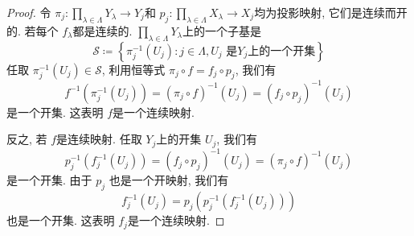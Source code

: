 \documentclass[../main.tex]{subfiles}
\begin{document}
\begin{proof}
    令 \(   \pi_{j}:\prod _{ \lambda \in  \Lambda }Y_{ \lambda }\to Y_{j}  \)和 \(  p_{j}:\prod _{ \lambda \in  \Lambda }X_{ \lambda }\to X_{j}  \)均为投影映射, 它们是连续而开的.  
    若每个 \(  f_{ \lambda }  \)都是连续的. 
    \(  \prod _{ \lambda \in  \Lambda }Y_{ \lambda }  \)上的一个子基是 \[
    \mathcal{S}\coloneqq \left\{  \pi_{j}^{-1} \left( U_{j} \right): j \in  \Lambda , U_{j}\text{ 是} Y_{j}\text{上的一个开集} \right\}
    \] 任取 \(   \pi_{j}^{-1} \left( U_{j} \right)\in \mathcal{S}   \), 利用恒等式 \(   \pi_{j}\circ f = f_{j}\circ p_{j}  \),  我们有 \[
    f^{-1} \left(  \pi_{j}^{-1} \left( U_{j} \right)  \right)= \left(  \pi_{j}\circ f \right)^{-1} \left( U_{j} \right)= \left( f_{j}\circ  p_{j} \right) ^{-1} \left( U_{j} \right) 
    \] 是一个开集. 这表明 \(  f  \)是一个连续映射. 

    反之, 若 \(  f  \)是连续映射. 任取 \(  Y_{ j }  \)上的开集 \(  U_{ j}  \), 我们有 \[
   p_{j}^{-1} \left( f_{j}^{-1} \left( U_{j} \right)  \right)   = \left( f_{j}\circ p_{j} \right)^{-1} \left( U_{j} \right)=\left(  \pi_{j}\circ f \right)^{-1} \left( U_{j} \right)  
    \]   是一个开集. 由于 \(  p_{j}  \)  也是一个开映射, 我们有 \[
    f_{j}^{-1} \left( U_{j} \right)= p_{j}\left( p_{j}^{-1} \left( f_{j}^{-1} \left( U_{j} \right)  \right)  \right)  
    \]也是一个开集. 这表明 \(  f_{j}  \)是一个连续映射.  
\end{proof}
\end{document}

